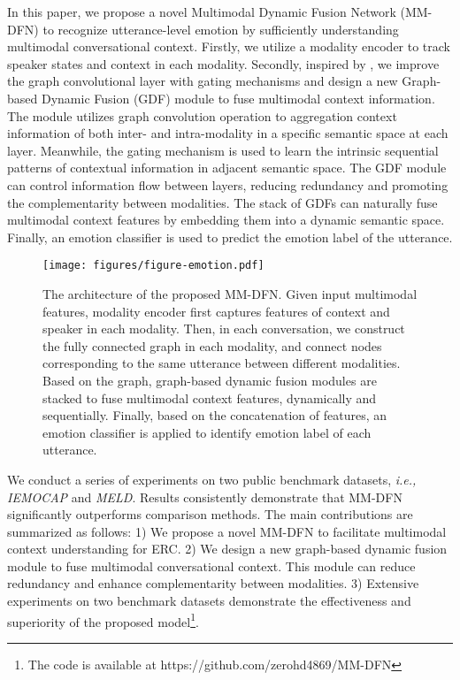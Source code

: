 \documentclass{article}
\begin{document}
In this paper, we propose a novel Multimodal Dynamic Fusion Network (MM-DFN) to recognize utterance-level emotion by sufficiently understanding multimodal conversational context.
Firstly, we utilize a modality encoder to 
track speaker states and context in each modality. 
Secondly, 
inspired by \cite{DBLP:journals/neco/HochreiterS97,DBLP:conf/icml/ChenWHDL20},
we improve the graph convolutional layer  \cite{DBLP:conf/iclr/KipfW17} with gating mechanisms and design a new Graph-based Dynamic Fusion (GDF) module to fuse multimodal context information. 
The module utilizes graph convolution operation to aggregation context information of both inter- and intra-modality in a specific semantic space at each layer.
Meanwhile, the gating mechanism is used to learn the intrinsic sequential patterns of contextual information in adjacent semantic space. The GDF module can control information flow between layers, reducing redundancy and promoting the complementarity between modalities.
The stack of GDFs can naturally fuse multimodal context features by embedding them into a dynamic semantic space. Finally, 
an emotion classifier is used to predict the emotion label of the utterance.
 

\begin{figure*}[t]
  \centering
  \texttt{[image: figures/figure-emotion.pdf]}
  \caption{The architecture of the proposed MM-DFN. Given input multimodal features, modality encoder first captures features of context and speaker in each modality.
  Then, in each conversation, we construct the fully connected graph in each modality, and connect nodes corresponding to the same utterance between different modalities.
  Based on the graph, graph-based dynamic fusion modules are stacked to fuse multimodal context features, dynamically and sequentially.  
    Finally, based on the concatenation of features, an emotion classifier is applied to identify emotion label of each utterance.
 }
  \label{fig:overall}
\end{figure*}
 



We conduct a series of experiments on two public benchmark datasets, {\it i.e.,} {\it IEMOCAP} and {\it MELD}. Results consistently demonstrate that MM-DFN significantly outperforms comparison methods.  The main contributions are summarized as follows:
1) We propose a novel MM-DFN to facilitate multimodal context understanding for ERC. 
2) We design a new graph-based dynamic fusion module to fuse multimodal conversational context.
This module can reduce redundancy and enhance complementarity between modalities.
3) Extensive experiments on two benchmark datasets demonstrate the effectiveness and superiority of the proposed model\footnote{The code is available at {https://github.com/zerohd4869/MM-DFN}}.
\end{document}
